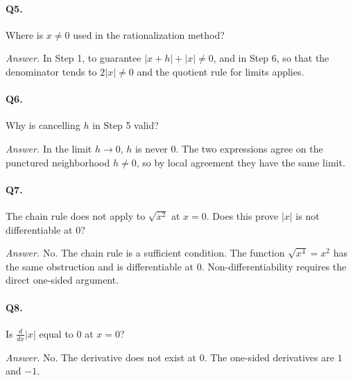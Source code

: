 \documentclass{essay}
\newcommand{\abs}[1]{\lvert #1 \rvert}
\begin{document}
\paragraph{Q5.} Where is $x \neq 0$ used in the rationalization method?

\noindent\textit{Answer.} In Step 1, to guarantee $\abs{x+h} + \abs{x} \neq 0$,
and in Step 6, so that the denominator tends to $2\abs{x} \neq 0$ and the
quotient rule for limits applies.

\paragraph{Q6.} Why is cancelling $h$ in Step 5 valid?

\noindent\textit{Answer.} In the limit $h \to 0$, $h$ is never $0$. The two
expressions agree on the punctured neighborhood $h \neq 0$, so by local
agreement they have the same limit.

\paragraph{Q7.} The chain rule does not apply to $\sqrt{x^2}$ at $x = 0$. Does
this prove $\abs{x}$ is not differentiable at $0$?

\noindent\textit{Answer.} No. The chain rule is a sufficient condition. The
function $\sqrt{x^4} = x^2$ has the same obstruction and is differentiable at
$0$. Non-differentiability requires the direct one-sided argument.

\paragraph{Q8.} Is $\frac{d}{dx}\abs{x}$ equal to $0$ at $x = 0$?

\noindent\textit{Answer.} No. The derivative does not exist at $0$. The
one-sided derivatives are $1$ and $-1$.
\end{document}
